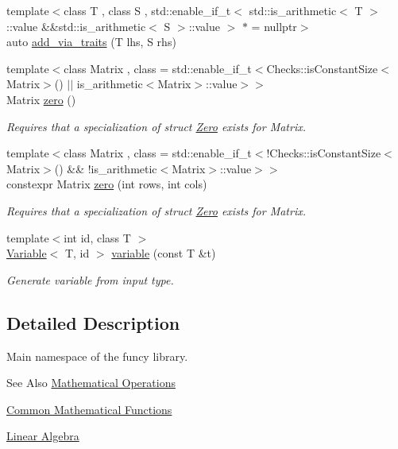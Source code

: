 \begin{DoxyCompactItemize}
\item 
{\footnotesize template$<$class T , class S , std\-::enable\-\_\-if\-\_\-t$<$ std\-::is\-\_\-arithmetic$<$ T $>$\-::value \&\&std\-::is\-\_\-arithmetic$<$ S $>$\-::value $>$ $\ast$  = nullptr$>$ }\\auto \hyperlink{namespacefuncy_a719edd142cb5aa7d10fc9a7c59c52fbc}{add\-\_\-via\-\_\-traits} (T lhs, S rhs)
\item 
{\footnotesize template$<$class Matrix , class  = std\-::enable\-\_\-if\-\_\-t$<$\-Checks\-::is\-Constant\-Size$<$\-Matrix$>$() $\vert$$\vert$ is\-\_\-arithmetic$<$\-Matrix$>$\-::value$>$$>$ }\\Matrix \hyperlink{namespacefuncy_ac1f22224f100309c6d5c5b336ddb3915}{zero} ()
\begin{DoxyCompactList}\small\item\em Requires that a specialization of struct \hyperlink{structfuncy_1_1Zero}{Zero} exists for Matrix. \end{DoxyCompactList}\item 
{\footnotesize template$<$class Matrix , class  = std\-::enable\-\_\-if\-\_\-t$<$!\-Checks\-::is\-Constant\-Size$<$\-Matrix$>$() \&\& !is\-\_\-arithmetic$<$\-Matrix$>$\-::value$>$$>$ }\\constexpr Matrix \hyperlink{namespacefuncy_a0f3ab3167272c9911b70265396fa049b}{zero} (int rows, int cols)
\begin{DoxyCompactList}\small\item\em Requires that a specialization of struct \hyperlink{structfuncy_1_1Zero}{Zero} exists for Matrix. \end{DoxyCompactList}\item 
{\footnotesize template$<$int id, class T $>$ }\\\hyperlink{structfuncy_1_1Variable}{Variable}$<$ T, id $>$ \hyperlink{namespacefuncy_aa3bdcf6464ce819a6888920c4db500d6}{variable} (const T \&t)
\begin{DoxyCompactList}\small\item\em Generate variable from input type. \end{DoxyCompactList}\end{DoxyCompactItemize}


\subsection{Detailed Description}
Main namespace of the funcy library. \begin{DoxySeeAlso}{See Also}
\hyperlink{group__MathematicalOperationsGroup}{Mathematical Operations} 

\hyperlink{group__CMathGroup}{Common Mathematical Functions} 

\hyperlink{group__LinearAlgebraGroup}{Linear Algebra} 
\end{DoxySeeAlso}


